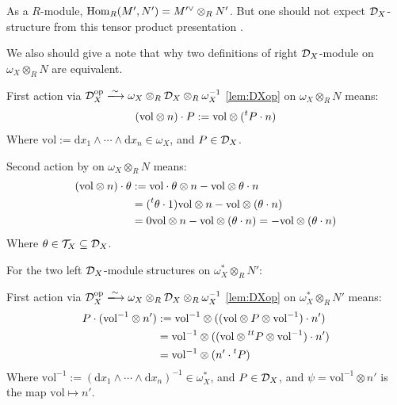 \begin{remark}
    As a $R$-module, $\operatorname{Hom}_{R}(M', N') = M'^{\vee} \otimes_R N'$.
    But one should not expect $\mathcal{D}_X$-structure from this tensor product presentation
    \cite[Caveat.~8.24]{SabbahSchnell_MHMChap8_TrainingDModules}.
\end{remark}

\begin{remark}
    We also should give a note that why two definitions of right $\mathcal{D}_X$-module on $\omega_X \otimes_R N$ are equivalent.

    First action via $\Dx^{\mathrm{op}} \xlongrightarrow{\sim} \ox \otimes_R \Dx \otimes_R \oxinv$ \ref{lem:DXop} on $\omega_X \otimes_R N$ means:
    \[
        (\mathrm{vol} \otimes n) \cdot P := \mathrm{vol} \otimes (\prescript{t}{}{P} \cdot n)
    \]
    Where $\mathrm{vol} := \mathrm{d}x_1 \wedge \cdots \wedge \mathrm{d}x_n \in \omega_X$, and $P \in \mathcal{D}_X$.

    Second action by \cite[Proposition~1.2.9]{hotta2008d} on $\omega_X \otimes_R N$ means:
    \begin{align*}
        (\mathrm{vol} \otimes n) \cdot \theta & := \mathrm{vol}\cdot \theta \otimes n - \mathrm{vol} \otimes \theta\cdot n                                \\
                                              & = (\prescript{t}{}{\theta} \cdot 1)\mathrm{vol} \otimes n - \mathrm{vol} \otimes (\theta\cdot n)          \\
                                              & = 0 \mathrm{vol} \otimes n - \mathrm{vol} \otimes (\theta\cdot n) = -\mathrm{vol} \otimes (\theta\cdot n)
    \end{align*}
    Where $\theta \in \mathcal{T}_X \subseteq \mathcal{D}_X$.

    \bigskip

    For the two left $\mathcal{D}_X$-module structures on $\omega_X^{\!*} \otimes_R N'$:

    First action via $\Dx^{\mathrm{op}} \xlongrightarrow{\sim} \ox \otimes_R \Dx \otimes_R \oxinv$ \ref{lem:DXop} on $\omega_X^{\!*} \otimes_R N'$ means:
    \begin{align*}
        P \cdot (\mathrm{vol}^{-1} \otimes n') & := \mathrm{vol}^{-1} \otimes ((\mathrm{vol} \otimes P \otimes \mathrm{vol}^{-1}) \cdot n')                  \\
                                               & = \mathrm{vol}^{-1} \otimes ((\mathrm{vol} \otimes \prescript{tt}{}{P} \otimes \mathrm{vol}^{-1}) \cdot n') \\
                                               & = \mathrm{vol}^{-1} \otimes (n' \cdot \prescript{t}{}{P})
    \end{align*}
    Where $\mathrm{vol}^{-1} := (\mathrm{d}x_1 \wedge \cdots \wedge \mathrm{d}x_n)^{-1} \in \omega_X^{\!*}$, and $P \in \mathcal{D}_X$, and $\psi = \mathrm{vol}^{-1} \otimes n'$ is the map $\mathrm{vol} \mapsto n'$.


\end{remark}
